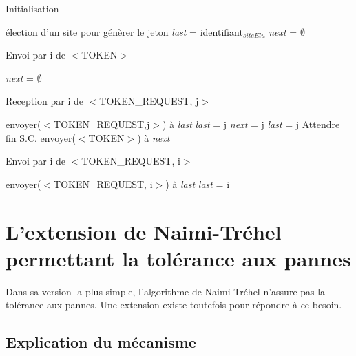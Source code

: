 \documentclass[a4paper,12pt]{report}
\newcommand{\nt}{Naimi-Tréhel }
\newcommand{\last}{\textit{last} }
\newcommand{\next}{\textit{next} }
\begin{document}
\begin{algorithm}[t]
\caption{Initialisation}
\label{algo_naimi_trehel_init}
\begin{algorithmic}[1]
\REQUIRE élection d'un site pour génèrer le jeton
\STATE \last = identifiant$_{siteElu}$
\STATE \next = $\emptyset$
\end{algorithmic}
\end{algorithm}

\begin{algorithm}[t]
\caption{Envoi par i de $<$TOKEN$>$}
\label{algo_naimi_trehel_envoi_token}
\begin{algorithmic}[1]
\STATE \next = $\emptyset$
\end{algorithmic}
\end{algorithm}

\begin{algorithm}[t]
\caption{Reception par i de $<$TOKEN\_REQUEST, j$>$}
\label{algo_naimi_trehel}
\begin{algorithmic}[1]

\IF {\last$_{i}$ $\ne$ i}
\STATE envoyer($<$TOKEN\_REQUEST,j$>$) à \last 
\STATE \last = j
\ELSE
\STATE \next = j
\STATE \last = j
\STATE Attendre fin S.C.
\STATE envoyer($<$TOKEN$>$) à \next
\ENDIF
\end{algorithmic}
\end{algorithm}

\begin{algorithm}[t]
\caption{Envoi par i de $<$TOKEN\_REQUEST, i$>$}
\label{algo_naimi_trehel_envoi_TK}
\begin{algorithmic}[1]
\STATE envoyer($<$TOKEN\_REQUEST, i$>$) à \last
\STATE \last = i
\end{algorithmic}
\end{algorithm}

\newpage

\section{L'extension de \nt permettant la tolérance aux pannes}

Dans sa version la plus simple, l'algorithme de \nt n'assure pas la tolérance aux pannes. Une extension existe toutefois pour répondre à ce besoin.

\subsection*{Explication du mécanisme}
\end{document}
